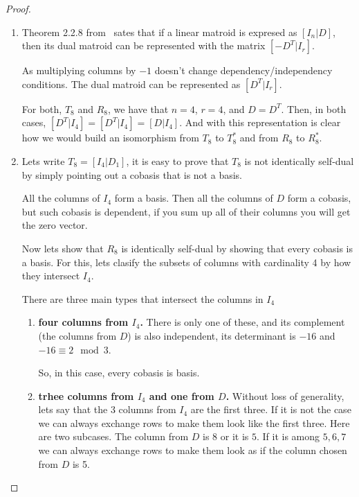 \begin{proof}$\,$\pn
    \begin{enumerate}[label=(\roman*)]
        \item 
        
            Theorem 2.2.8 from~\cite{Oxley} sates that if a linear matroid is expresed as $[I_n | D]$,
            then its dual matroid can be represented with the matrix $[-D^T | I_r]$.\pn
            
            As multiplying columns by $-1$ doesn't change dependency/independency conditions. The dual matroid can be represented
            as $[D^T | I_r]$.\pn
            
            For both, $T_8$ and $R_8$, we have that $n = 4$, $r = 4$, and $D = D^T$. Then, in both cases, 
            $[D^T | I_4] = [D^T | I_4] = [D | I_4]$. And with this representation is clear how we would build an
            isomorphism from $T_8$ to $T_8^*$ and from $R_8$ to $R_8^*$.
            
        \item
            Lets write $T_8 = [I_4 | D_1]$, it is easy to prove that $T_8$ is not identically self-dual by
            simply pointing out a cobasis that is not a basis.\pn
            
            All the columns of $I_4$ form a basis. Then all the columns of $D$ form a cobasis, but such cobasis is
            dependent, if you sum up all of their columns you will get the zero vector.\pn
            
            Now lets show that $R_8$ is identically self-dual by showing that every cobasis is a basis. 
            For this, lets clasify the subsets of columns with cardinality 4 by how they intersect $I_4$.\pn
            
            There are three main types that intersect the columns in $I_4$
                \begin{enumerate}
                    \item \textbf{four columns from $I_4$.}
                        There is only one of these, and its complement (the columns from $D$) is also independent, its determinant
                        is $-16$ and $-16 \equiv 2 \mod 3$.
                        
                        So, in this case, every cobasis is basis.
                    \item \textbf{trhee columns from $I_4$ and one from $D$.}
                        Without loss of generality, lets say that the 3 columns from $I_4$ are the first three. If it is not the
                        case we can always exchange rows to make them look like the first three. Here are two subcases. The column
                        from $D$ is $8$ or it is $5$. If it is among $5, 6, 7$ we can always exchange rows to make them look
                        as if the column chosen from $D$ is 5.\pn
                        

\end{enumerate}
\end{enumerate}
\end{proof}
